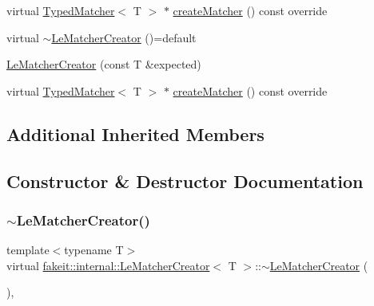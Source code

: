 \begin{DoxyCompactItemize}
virtual \mbox{\hyperlink{structfakeit_1_1TypedMatcher}{Typed\+Matcher}}$<$ T $>$ $\ast$ \mbox{\hyperlink{structfakeit_1_1internal_1_1LeMatcherCreator_a413d0c534701c79a96648111a337f270}{create\+Matcher}} () const override
\item 
virtual \mbox{\hyperlink{structfakeit_1_1internal_1_1LeMatcherCreator_ac886c9e22851607c9464000a64fa5654}{$\sim$\+Le\+Matcher\+Creator}} ()=default
\item 
\mbox{\hyperlink{structfakeit_1_1internal_1_1LeMatcherCreator_a58c849c7f94f5a3fd319b267173cee2b}{Le\+Matcher\+Creator}} (const T \&expected)
\item 
virtual \mbox{\hyperlink{structfakeit_1_1TypedMatcher}{Typed\+Matcher}}$<$ T $>$ $\ast$ \mbox{\hyperlink{structfakeit_1_1internal_1_1LeMatcherCreator_a413d0c534701c79a96648111a337f270}{create\+Matcher}} () const override
\end{DoxyCompactItemize}
\subsection*{Additional Inherited Members}


\subsection{Constructor \& Destructor Documentation}
\mbox{\label{structfakeit_1_1internal_1_1LeMatcherCreator_ac886c9e22851607c9464000a64fa5654}} 
\subsubsection{\texorpdfstring{$\sim$LeMatcherCreator()}{~LeMatcherCreator()}\hspace{0.1cm}{\footnotesize\ttfamily [1/9]}}
{\footnotesize\ttfamily template$<$typename T$>$ \\
virtual \mbox{\hyperlink{structfakeit_1_1internal_1_1LeMatcherCreator}{fakeit\+::internal\+::\+Le\+Matcher\+Creator}}$<$ T $>$\+::$\sim$\mbox{\hyperlink{structfakeit_1_1internal_1_1LeMatcherCreator}{Le\+Matcher\+Creator}} (\begin{DoxyParamCaption}{ }\end{DoxyParamCaption})\hspace{0.3cm}{\ttfamily [virtual]}, {\ttfamily [default]}}

